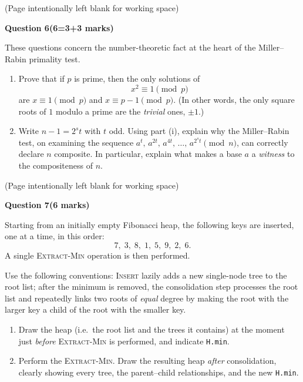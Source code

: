 \documentclass[12pt,letterpaper]{article}
\newcommand{\marksbox}[1]{%
  \vfill
  \begin{flushright}
    \fbox{\parbox[c][1.1cm][c]{1.3cm}{\centering #1}}
  \end{flushright}
}
\newcommand{\questiontitle}[2]{%
  \textbf{Question #1}\hfill\textbf{(#2 marks)}
}
\newcommand{\workingpage}{%
  \newpage
  \begin{center}
    (Page intentionally left blank for working space)
  \end{center}
}
\begin{document}
\marksbox{6}

\workingpage
\newpage

\questiontitle{6}{6=3+3}

These questions concern the number-theoretic fact at the heart of the
Miller--Rabin primality test.

\begin{enumerate}
  \item[(i)] Prove that if $p$ is prime, then the only solutions of
  \[
    x^{2} \equiv 1 \pmod{p}
  \]
  are $x \equiv 1 \pmod{p}$ and $x \equiv p - 1 \pmod{p}$. (In other words, the
  only square roots of $1$ modulo a prime are the \emph{trivial} ones,
  $\pm 1$.)

  \item[(ii)] Write $n - 1 = 2^{s} t$ with $t$ odd. Using part (i), explain why
  the Miller--Rabin test, on examining the sequence
  $a^{t},\, a^{2t},\, a^{4t},\, \ldots,\, a^{2^{s} t} \pmod{n}$, can correctly
  declare $n$ composite. In particular, explain what makes a base $a$ a
  \emph{witness} to the compositeness of $n$.
\end{enumerate}

\marksbox{6}

\workingpage
\newpage

\questiontitle{7}{6}

Starting from an initially empty Fibonacci heap, the following keys are
inserted, one at a time, in this order:
\[
  7,\; 3,\; 8,\; 1,\; 5,\; 9,\; 2,\; 6.
\]
A single \textsc{Extract-Min} operation is then performed.

Use the following conventions: \textsc{Insert} lazily adds a new single-node
tree to the root list; after the minimum is removed, the consolidation step
processes the root list and repeatedly links two roots of \emph{equal} degree
by making the root with the larger key a child of the root with the smaller
key.

\begin{enumerate}
  \item[(i)] Draw the heap (i.e.\ the root list and the trees it contains) at
  the moment just \emph{before} \textsc{Extract-Min} is performed, and indicate
  \texttt{H.min}.

  \item[(ii)] Perform the \textsc{Extract-Min}. Draw the resulting heap
  \emph{after} consolidation, clearly showing every tree, the parent--child
  relationships, and the new \texttt{H.min}.
\end{enumerate}
\end{document}
